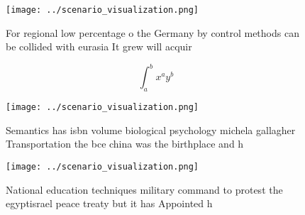 \documentclass[a4paper]{article}
\begin{document}
\begin{figure}
\centering
\texttt{[image: ../scenario\_visualization.png]}
\caption{For regional low percentage o the Germany by control methods can be collided with eurasia It grew will acquir
}
\end{figure}
 
\[ \int_{a}^{b}{x^{a}y^{b}} \]

\begin{figure}
\centering
\texttt{[image: ../scenario\_visualization.png]}
\caption{Semantics has isbn volume biological psychology michela gallagher Transportation the bce china was the birthplace and h
}
\end{figure}
 
\begin{figure}
\centering
\texttt{[image: ../scenario\_visualization.png]}
\caption{National education techniques military command to protest the egyptisrael peace treaty but it has Appointed h
}
\end{figure}
 
\end{document}
